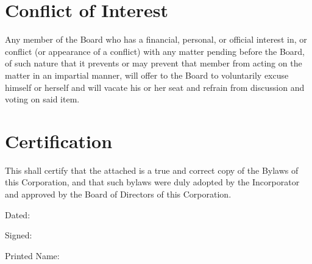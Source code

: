 \documentclass{article}
\begin{document}
\section{Conflict of Interest}
Any member of the Board who has a financial, personal, or official interest in, or conflict 
(or appearance of a conflict) with any matter pending before the Board, of such nature that it 
prevents or may prevent that member from acting on the matter in an impartial manner, 
will offer to the Board to voluntarily excuse himself or herself and will vacate his or her seat 
and refrain from discussion and voting on said item.
\section{Certification}
This shall certify that the attached is a true and correct copy of the Bylaws of this 
Corporation, and that such bylaws were duly adopted by the Incorporator and approved by 
the Board of Directors of this Corporation.

Dated:

Signed:

Printed Name:
\end{document}
